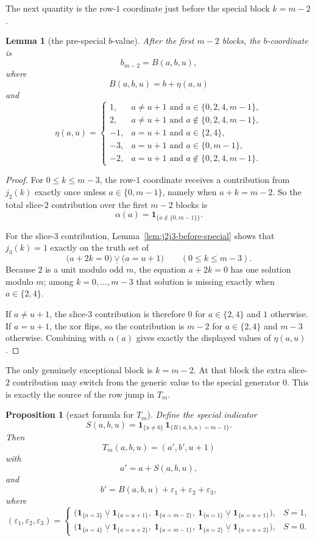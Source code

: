 \documentclass[11pt]{article}
\newtheorem{proposition}[theorem]{Proposition}
\newtheorem{lemma}[theorem]{Lemma}
\newcommand{\1}{\mathbf 1}
\newcommand{\xor}{\mathbin{\underline{\vee}}}
\begin{document}
The next quantity is the row-$1$ coordinate just before the special block
$k=m-2$.

\begin{lemma}[the pre-special $b$-value]\label{lem:B-formula}
After the first $m-2$ blocks, the $b$-coordinate is
\[
b_{m-2}=B(a,b,u),
\]
where
\[
B(a,b,u)=b+\eta(a,u)
\]
and
\[
\eta(a,u)=
\begin{cases}
1, & a\ne u+1\text{ and }a\in\{0,2,4,m-1\},\\
2, & a\ne u+1\text{ and }a\notin\{0,2,4,m-1\},\\
-1, & a=u+1\text{ and }a\in\{2,4\},\\
-3, & a=u+1\text{ and }a\in\{0,m-1\},\\
-2, & a=u+1\text{ and }a\notin\{0,2,4,m-1\}.
\end{cases}
\]
\end{lemma}

\begin{proof}
For $0\le k\le m-3$, the row-$1$ coordinate receives a contribution from
$j_2(k)$ exactly once unless $a\in\{0,m-1\}$, namely when $a+k=m-2$.
So the total slice-$2$ contribution over the first $m-2$ blocks is
\[
\alpha(a)=\1_{\{a\notin\{0,m-1\}\}}.
\]

For the slice-$3$ contribution, Lemma~\ref{lem:j2j3-before-special} shows that
$j_3(k)=1$ exactly on the truth set of
\[
\bigl(a+2k=0\bigr)\xor\bigl(a=u+1\bigr)
\qquad (0\le k\le m-3).
\]
Because $2$ is a unit modulo odd $m$, the equation $a+2k=0$ has one solution
modulo $m$; among $k=0,\dots,m-3$ that solution is missing exactly when
$a\in\{2,4\}$.

If $a\ne u+1$, the slice-$3$ contribution is therefore $0$ for
$a\in\{2,4\}$ and $1$ otherwise.
If $a=u+1$, the xor flips, so the contribution is $m-2$ for
$a\in\{2,4\}$ and $m-3$ otherwise.
Combining with $\alpha(a)$ gives exactly the displayed values of $\eta(a,u)$.
\end{proof}

The only genuinely exceptional block is $k=m-2$. At that block the extra slice-
$2$ contribution may switch from the generic value to the special generator $0$.
This is exactly the source of the row jump in $T_m$.

\begin{proposition}[exact formula for $T_m$]\label{prop:T-exact}
Define the special indicator
\[
S(a,b,u)=\1_{\{u\ne 6\}}\,\1_{\{B(a,b,u)=m-1\}}.
\]
Then
\[
T_m(a,b,u)=(a',b',u+1)
\]
with
\[
a'=a+S(a,b,u),
\]
and
\[
b'=B(a,b,u)+\varepsilon_1+\varepsilon_2+\varepsilon_3,
\]
where
\[
(\varepsilon_1,\varepsilon_2,\varepsilon_3)=
\begin{cases}
\bigl(\1_{\{a=3\}}\xor \1_{\{a=u+1\}},\ \1_{\{a=m-2\}},\ \1_{\{a=1\}}\xor \1_{\{a=u+1\}}\bigr), & S=1,\\[0.5ex]
\bigl(\1_{\{a=4\}}\xor \1_{\{a=u+2\}},\ \1_{\{a=m-1\}},\ \1_{\{a=2\}}\xor \1_{\{a=u+2\}}\bigr), & S=0.
\end{cases}
\]
\end{proposition}
\end{document}

